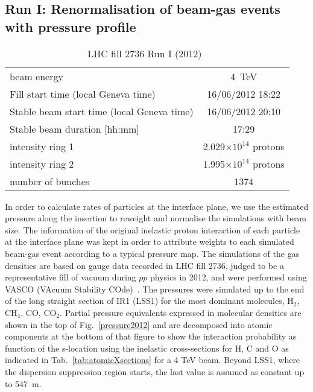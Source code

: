 \subsection{Run I: Renormalisation of beam-gas events with pressure profile \label{BGreweighted4TeV}}

\begin{table}
   \centering
   \caption{LHC fill 2736 Run I (2012)~\cite{refAccStats}}
   \begin{tabular}{l||c}
       \hline
       beam energy  & 4~TeV \\
       Fill start time (local Geneva time) & 16/06/2012 18:22\\
       Stable beam start time (local Geneva time) & 16/06/2012 20:10\\
       Stable beam duration [hh:mm] & 17:29\\
       intensity ring 1& 2.029$\times 10^{14}$ protons\\
       intensity ring 2& 1.995$\times 10^{14}$ protons\\
       number of bunches & 1374 \\
       \hline
   \end{tabular}
   \label{tab:fillRunI}
\end{table}
In order to calculate rates of particles at the interface plane, we use the estimated pressure along the insertion to reweight and normalise the simulations with beam size.
The information of the original inelastic proton interaction of each particle at the interface plane was kept in order to attribute weights to each simulated beam-gas event according to a typical pressure map. The simulations of the gas densities are based on gauge data recorded in LHC fill 2736, judged to be a representative fill of vacuum during $pp$ physics in 2012, and were performed using VASCO (VAcuum Stability COde)~\cite{vascoRef}. The pressures were simulated up to the end of the long straight section of IR1 (LSS1) for the most dominant molecules, H$_2$, CH$_4$, CO, CO$_2$. Partial pressure equivalents expressed in molecular densities are shown in the top of Fig.~\ref{pressure2012} and are decomposed into atomic components at the bottom of that figure to show the interaction probability as function of the s-location using the inelastic cross-sections for H, C and O as indicated in Tab.~\ref{tab:atomicXsections} for a 4 TeV beam. Beyond LSS1, where the dispersion suppression region starts, the last value is assumed as constant up to 547~m.

